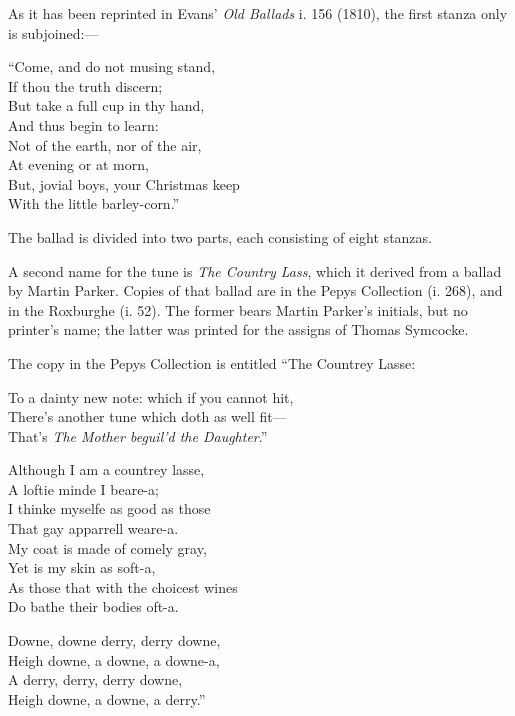 As it has been reprinted in Evans’ \textit{Old Ballads} i. 156 (1810), the first stanza
only is subjoined:—
\begin{dcverse}\begin{altverse}
“Come, and do not musing stand,\\
If thou the truth discern;\\
But take a full cup in thy hand,\\
And thus begin to learn:\\
Not of the earth, nor of the air,\\
At evening or at morn,\\
But, jovial boys, your Christmas keep\\
With the little barley-corn.”
\end{altverse}
\end{dcverse}
\noindent The ballad is divided into two parts, each consisting of eight stanzas.
\pagebreak

A second name for the tune is \textit{The Country Lass}, which it derived from a
ballad by Martin Parker. Copies of that ballad are in the Pepys Collection
(i. 268), and in the Roxburghe (i. 52). The former bears Martin Parker’s
initials, but no printer’s name; the latter was printed for the assigns of Thomas
Symcocke.

The copy in the Pepys Collection is entitled “The Countrey Lasse:
\settowidth{\versewidth}{To a dainty new note: which if you cannot hit,}
\begin{scverse}
To a dainty new note: which if you cannot hit,\\
There’s another tune which doth as well fit—\\
That’s \textit{The Mother beguil’d the Daughter}.”
\end{scverse}

\settowidth{\versewidth}{Although I am a countrey lasse,}
\begin{dcverse}\begin{altverse}
Although I am a countrey lasse,\\
A loftie minde I beare-a;\\
I thinke myselfe as good as those\\
That gay apparrell weare-a.\\
My coat is made of comely gray,\\
Yet is my skin as soft-a,\\
As those that with the choicest wines\\
Do bathe their bodies oft-a.
\end{altverse}

\begin{altverse}
Downe, downe derry, derry downe,\\
Heigh downe, a downe, a downe-a,\\
A derry, derry, derry downe,\\
Heigh downe, a downe, a derry.”
\end{altverse}
\end{dcverse}

